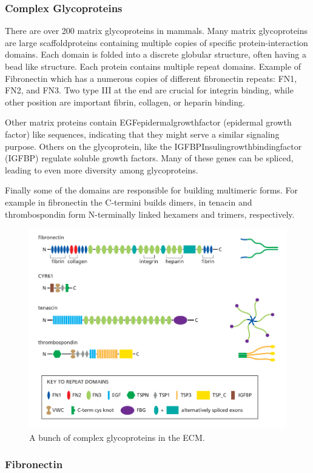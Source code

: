 \documentclass[../main.tex]{subfiles}
\begin{document}
\subsubsection{Complex Glycoproteins}

There are over 200 matrix glycoproteins in mammals. Many matrix glycoproteins are large \gls{scaffoldproteins} containing multiple copies of specific protein-interaction domains. Each domain is folded into a discrete globular structure, often having a bead like structure. Each protein contains multiple repeat domains. 
Example of Fibronectin which has a numerous copies of different \gls{fibronectin} repeats: \gls{FN1}, \gls{FN2}, and \gls{FN3}. Two type III at the end are crucial for integrin binding, while other position are important fibrin, collagen, or heparin binding. 

Other matrix proteins contain \gls{EGFepidermalgrowthfactor} (epidermal growth factor) like sequences, indicating that they might serve a similar signaling purpose. Others on the glycoprotein, like the \gls{IGFBPInsulingrowthbindingfactor} (IGFBP) regulate soluble growth factors. Many of these genes can be spliced, leading to even more diversity among glycoproteins.

Finally some of the domains are responsible for building multimeric forms. For example in fibronectin the C-termini builds dimers, in \gls{tenacin} and \gls{thrombospondin} form N-terminally linked hexamers and trimers, respectively.

\begin{figure}[H]
	\centering
	\includegraphics[width=0.6\linewidth]{glyc_comp}
	\caption{A bunch of complex glycoproteins in the ECM.}
	\label{fig:glyccomp}
\end{figure}


\subsubsection{Fibronectin}
\end{document}
